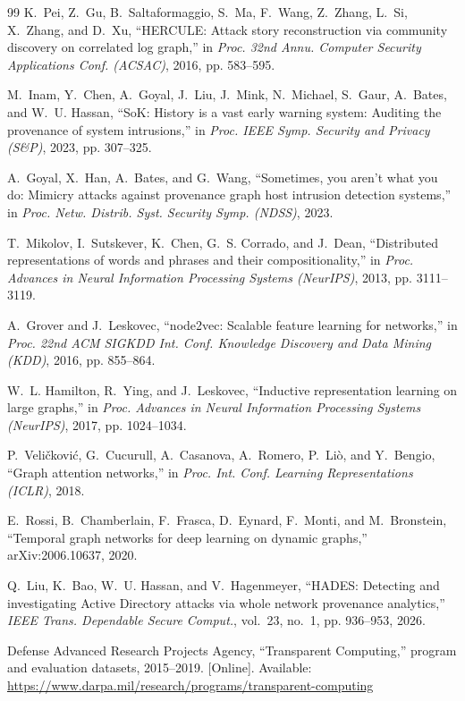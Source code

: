 \documentclass[lettersize,journal]{IEEEtran}
\begin{document}
\begin{thebibliography}{99}
K.~Pei, Z.~Gu, B.~Saltaformaggio, S.~Ma, F.~Wang, Z.~Zhang, L.~Si, X.~Zhang,
and D.~Xu, ``HERCULE: Attack story reconstruction via community discovery on
correlated log graph,'' in \emph{Proc. 32nd Annu. Computer Security Applications
Conf. (ACSAC)}, 2016, pp. 583--595.

M.~Inam, Y.~Chen, A.~Goyal, J.~Liu, J.~Mink, N.~Michael, S.~Gaur, A.~Bates,
and W.~U. Hassan, ``SoK: History is a vast early warning system: Auditing the
provenance of system intrusions,'' in \emph{Proc. IEEE Symp. Security and Privacy
(S\&P)}, 2023, pp. 307--325.

A.~Goyal, X.~Han, A.~Bates, and G.~Wang, ``Sometimes, you aren't what you do:
Mimicry attacks against provenance graph host intrusion detection systems,'' in
\emph{Proc. Netw. Distrib. Syst. Security Symp. (NDSS)}, 2023.

T.~Mikolov, I.~Sutskever, K.~Chen, G.~S. Corrado, and J.~Dean, ``Distributed
representations of words and phrases and their compositionality,'' in \emph{Proc.
Advances in Neural Information Processing Systems (NeurIPS)}, 2013,
pp. 3111--3119.

A.~Grover and J.~Leskovec, ``node2vec: Scalable feature learning for networks,''
in \emph{Proc. 22nd ACM SIGKDD Int. Conf. Knowledge Discovery and Data Mining
(KDD)}, 2016, pp. 855--864.

W.~L. Hamilton, R.~Ying, and J.~Leskovec, ``Inductive representation learning
on large graphs,'' in \emph{Proc. Advances in Neural Information Processing
Systems (NeurIPS)}, 2017, pp. 1024--1034.

P.~Veli\v{c}kovi\'c, G.~Cucurull, A.~Casanova, A.~Romero, P.~Li\`o, and
Y.~Bengio, ``Graph attention networks,'' in \emph{Proc. Int. Conf. Learning
Representations (ICLR)}, 2018.

E.~Rossi, B.~Chamberlain, F.~Frasca, D.~Eynard, F.~Monti, and M.~Bronstein,
``Temporal graph networks for deep learning on dynamic graphs,''
arXiv:2006.10637, 2020.

Q.~Liu, K.~Bao, W.~U. Hassan, and V.~Hagenmeyer, ``HADES: Detecting and
investigating Active Directory attacks via whole network provenance analytics,''
\emph{IEEE Trans. Dependable Secure Comput.}, vol.~23, no.~1, pp. 936--953,
2026.

Defense Advanced Research Projects Agency, ``Transparent Computing,'' program
and evaluation datasets, 2015--2019. [Online]. Available:
\url{https://www.darpa.mil/research/programs/transparent-computing}

\end{thebibliography}
\end{document}
